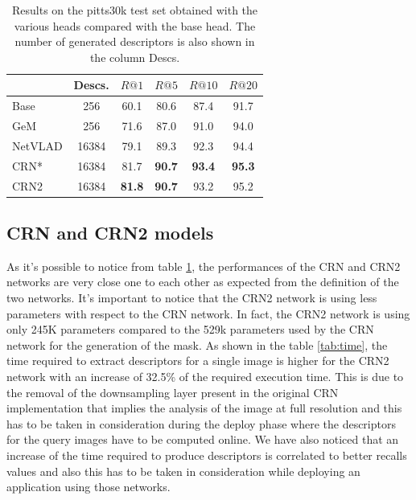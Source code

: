 \documentclass[10pt,twocolumn,letterpaper]{article}
\begin{document}
\begin{table}
	\centering
	\begin{tabular}{|l|c|c|c|c|c|}
		\hline
		& Descs.&        $R@1$   &        $R@5$   &        $R@10$  &        $R@20$   \\ \hline
		Base     & 256   &         60.1   &         80.6   &          87.4   &          91.7   \\
		GeM      & 256   &         71.6   &         87.0   &          91.0   &          94.0   \\
		NetVLAD  & 16384 &         79.1   &         89.3   &          92.3   &          94.4   \\ \hline
		CRN*     & 16384 &         81.7   & \textbf{90.7}  &  \textbf{93.4}  &  \textbf{95.3}  \\
		CRN2     & 16384 &\textbf{81.8}   & \textbf{90.7}  &          93.2   &          95.2   \\ \hline
	\end{tabular}
	\caption{Results on the pitts30k test set obtained with the various heads compared with the base head. The number of generated descriptors 
		is also shown in the column Descs.}
	\label{tab:base_results}
\end{table}

\subsection{CRN and CRN2 models}
As it's possible to notice from table \ref{tab:base_results}, the performances of the CRN and CRN2 networks are very close one to each other as expected
from the definition of the two networks. It's important to notice that the CRN2 network is using less parameters with respect to the CRN network. In fact,
the CRN2 network is using only 245K parameters compared to the 529k parameters used by the CRN network for the generation of the mask.
As shown in the table \ref{tab:time}, the time required to extract descriptors for a single image is higher for the CRN2 network with an increase of 32.5\% 
of the required execution time. This is due to the removal of the downsampling layer present in the original CRN implementation that implies the analysis of the image 
at full resolution and this 
has to be taken in consideration during the deploy phase where the descriptors for the query images have to be computed online. We have also noticed that an increase
of the time required to produce descriptors is correlated to better recalls values and also this has to be taken in consideration while deploying an 
application using those networks.
\end{document}
